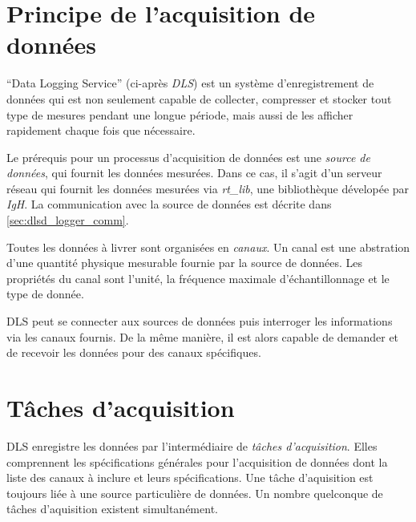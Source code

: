 \documentclass[a4paper,12pt,BCOR6mm,bibtotoc,idxtotoc]{scrbook}
\begin{document}

\section{Principe de l'acquisition de donn\'ees}
\label{sec:allg_grund}

``Data Logging Service'' (ci-apr\`es \textit{DLS}) est un
syst\`eme d'enregistrement de donn\'ees qui est non seulement capable
de collecter, compresser et stocker tout type de mesures pendant une
longue p\'eriode, mais aussi de les afficher rapidement chaque fois que
n\'ecessaire.

Le pr\'erequis pour un processus d'acquisition de donn\'ees est une
\textit{source de donn\'ees}, qui fournit
les donn\'ees mesur\'ees. Dans ce cas, il s'agit d'un serveur r\'eseau
qui fournit les donn\'ees mesurées via \textit{rt\_lib}, une
biblioth\`eque d\'evelop\'ee par \textit{IgH}.  La communication avec
la source de donn\'ees est d\'ecrite dans
\autoref{sec:dlsd_logger_comm}.

Toutes les donn\'ees \`a livrer sont organis\'ees en
\textit{canaux}. Un canal est une abstration
d'une quantit\'e physique mesurable fournie par la source de
donn\'ees.  Les propri\'et\'es du canal sont
l'unit\'e, la fr\'equence maximale
d'\'echantillonnage et le type de
donn\'ee.

DLS peut se connecter aux sources de donn\'ees puis interroger les
informations via les canaux fournis.  De la m\^eme mani\`ere, il est
alors capable de demander et de recevoir les donn\'ees pour des canaux
sp\'ecifiques.


\section{T\^aches d'acquisition}
\label{sec:allg_jobs}

DLS enregistre les donn\'ees par l'interm\'ediaire de \textit{t\^aches
  d'acquisition}.  Elles comprennent
les sp\'ecifications g\'en\'erales pour l'acquisition de donn\'ees
dont la liste des canaux \`a inclure et leurs sp\'ecifications.  Une
t\^ache d'aquisition est toujours li\'ee \`a une source particuli\`ere
de donn\'ees. Un nombre quelconque de t\^aches d'aquisition existent
simultan\'ement.
\end{document}
